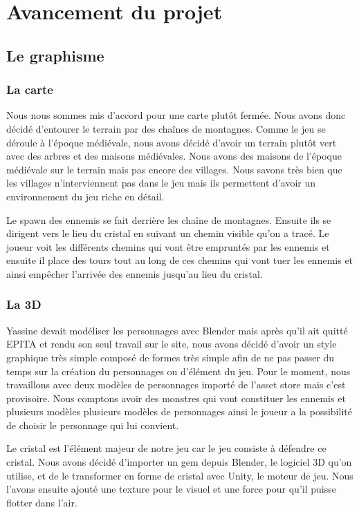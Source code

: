 \documentclass[a4paper, 12pt]{article}
\begin{document}
\section{Avancement du projet}
	\subsection{Le graphisme}
		\subsubsection{La carte}
		Nous nous sommes mis d’accord pour une carte plutôt fermée. Nous avons donc décidé d’entourer le terrain par des chaînes de montagnes. Comme le jeu se déroule à l’époque médiévale, nous avons décidé d’avoir un terrain plutôt vert avec des arbres et des maisons médiévales. Nous avons des maisons de l’époque médiévale sur le terrain mais pas encore des villages. Nous savons très bien que les villages n’interviennent pas dans le jeu mais ils permettent d’avoir un environnement du jeu riche en détail. 
\par Le spawn des ennemis se fait derrière les chaîne de montagnes. Ensuite ils se dirigent vers le lieu du cristal en suivant un chemin visible qu’on a tracé. Le joueur voit les différents chemins qui vont être empruntés par les ennemis et ensuite il place des tours tout au long de ces chemins qui vont tuer les ennemis et ainsi empêcher l’arrivée des ennemis jusqu’au lieu du cristal.

		\subsubsection{La 3D}
		Yassine devait modéliser les personnages avec Blender mais après qu’il ait quitté EPITA et rendu son seul travail sur le site, nous avons décidé d’avoir un style graphique très simple composé de formes très simple afin de ne pas passer du temps sur la création du personnages ou d’élément du jeu.  Pour le moment, nous travaillons avec deux modèles de personnages importé de l’asset store mais c’est provisoire. Nous comptons avoir des monstres qui vont constituer les ennemis et plusieurs modèles plusieurs modèles de personnages ainsi le joueur a la possibilité de choisir le personnage qui lui convient.  
\par Le cristal est l’élément majeur de notre jeu car le jeu consiste à défendre ce cristal. Nous avons décidé d’importer un gem depuis Blender, le logiciel 3D qu’on utilise, et de le transformer en forme de cristal avec Unity, le moteur de jeu. Nous l’avons ensuite ajouté une texture pour le visuel et une force pour qu’il puisse flotter dans l’air.
\end{document}
